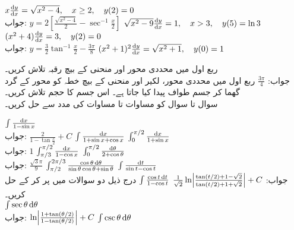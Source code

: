 $x\frac{\dif y}{\dif x}=\sqrt{x^2-4},\quad x\ge 2,\quad y(2)=0$\\
جواب:\quad
$y=2[\tfrac{\sqrt{x^2-4}}{2}-\sec^{-1}\tfrac{x}{2}]$
$\sqrt{x^2-9}\frac{\dif y}{\dif x}=1,\quad x>3,\quad y(5)=\ln 3$
$(x^2+4)\frac{\dif y}{\dif x}=3,\quad y(2)=0$\\
جواب:\quad
$y=\tfrac{3}{2}\tan^{-1}\tfrac{x}{2}-\tfrac{3\pi}{8}$
$(x^2+1)^2\frac{\dif y}{\dif x}=\sqrt{x^2+1},\quad y(0)=1$

ربع اول میں محددی محور اور منحنی  کے بیچ رقبہ تلاش کریں۔\\
جواب:\quad
$\tfrac{3\pi}{4}$
ربع اول میں محددی محور، لکیر  اور منحنی  کے بیچ خطہ کو محور  کے گرد گھما کر جسم طواف پیدا کیا جاتا ہے۔ اس جسم کا حجم تلاش کریں۔
\\
سوال  تا سوال  کو  مساوات  تا مساوات  کی مدد سے حل کریں۔ 

$\int\frac{\dif x}{1-\sin x}$\\
جواب:\quad
$\tfrac{2}{1-\tan\tfrac{x}{2}}+C$
$\int\frac{\dif x}{1+\sin x+\cos x}$
$\int_0^{\pi/2}\frac{\dif x}{1+\sin x}$\\
جواب:\quad
$1$
$\int_{\pi/3}^{\pi/2}\frac{\dif x}{1-\cos x}$
$\int_0^{\pi/2}\frac{\dif\theta}{2+\cos\theta}$\\
جواب:\quad
$\tfrac{\sqrt{3}\pi}{9}$
$\int_{\pi/2}^{2\pi/3}\frac{\cos\theta\dif\theta}{\sin\theta\cos\theta+\sin\theta}$
$\int\frac{\dif t}{\sin t-\cos t}$\\
جواب:\quad
$\tfrac{1}{\sqrt{2}}\ln\abs{\tfrac{\tan(t/2)+1-\sqrt{2}}{\tan(t/2)+1+\sqrt{2}}}+C$
$\int\frac{\cos t\dif t}{1-\cos t}$
درج ذیل دو سوالات میں  پر کر کے حل کریں۔\\
$\int\sec\theta\dif\theta$\\
جواب:\quad
$\ln\abs{\tfrac{1+\tan(\theta/2)}{1-\tan(\theta/2)}}+C$
$\int\csc\theta\dif\theta$

